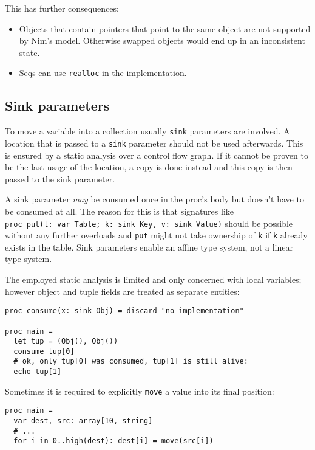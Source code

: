 This has further consequences:

\begin{itemize}
\tightlist
\item
  Objects that contain pointers that point to the same object are not
  supported by Nim's model. Otherwise swapped objects would end up in an
  inconsistent state.
\item
  Seqs can use \texttt{realloc} in the implementation.
\end{itemize}

\hypertarget{sink-parameters}{%
\subsection{Sink parameters}\label{sink-parameters}}

To move a variable into a collection usually \texttt{sink} parameters
are involved. A location that is passed to a \texttt{sink} parameter
should not be used afterwards. This is ensured by a static analysis over
a control flow graph. If it cannot be proven to be the last usage of the
location, a copy is done instead and this copy is then passed to the
sink parameter.

A sink parameter \emph{may} be consumed once in the proc's body but
doesn't have to be consumed at all. The reason for this is that
signatures like
\texttt{proc\ put(t:\ var\ Table;\ k:\ sink\ Key,\ v:\ sink\ Value)}
should be possible without any further overloads and \texttt{put} might
not take ownership of \texttt{k} if \texttt{k} already exists in the
table. Sink parameters enable an affine type system, not a linear type
system.

The employed static analysis is limited and only concerned with local
variables; however object and tuple fields are treated as separate
entities:

\begin{verbatim}
proc consume(x: sink Obj) = discard "no implementation"

proc main =
  let tup = (Obj(), Obj())
  consume tup[0]
  # ok, only tup[0] was consumed, tup[1] is still alive:
  echo tup[1]
\end{verbatim}

Sometimes it is required to explicitly \texttt{move} a value into its
final position:

\begin{verbatim}
proc main =
  var dest, src: array[10, string]
  # ...
  for i in 0..high(dest): dest[i] = move(src[i])
\end{verbatim}

